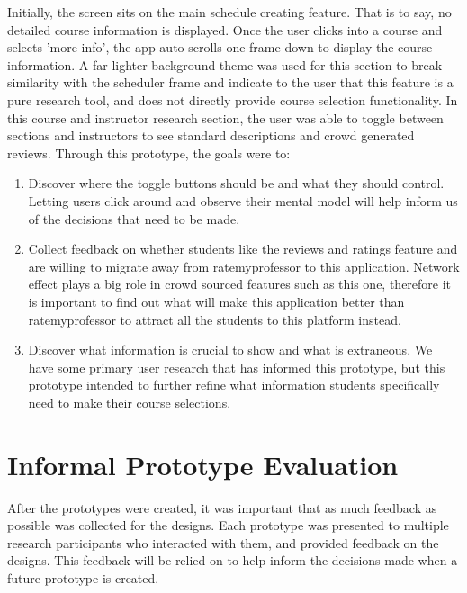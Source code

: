 \documentclass{article}
\begin{document}
\vspace{1em}
\noindent
Initially, the screen sits on the main schedule creating feature. That is to say, no detailed course information is displayed.
Once the user clicks into a course and selects 'more info', the app auto-scrolls one frame down to display the course information. 
A far lighter background theme was used for this section to break similarity with the scheduler frame and indicate to the user that this feature is a pure research tool, and does not directly provide course selection functionality. 
In this course and instructor research section, the user was able to toggle between sections and instructors to see standard descriptions and crowd generated reviews.
\newline
\newline
Through this prototype, the goals were to:
\begin{enumerate}[label=\alph*]
\item Discover where the toggle buttons should be and what they should control. Letting users click around and observe their mental model will help inform us of the decisions that need to be made. 
\item Collect feedback on whether students like the reviews and ratings feature and are willing to migrate away from ratemyprofessor to this application. Network effect plays a big role in crowd sourced features such as this one, therefore it is important to find out what will make this application better than ratemyprofessor to attract all the students to this platform instead.
\item Discover what information is crucial to show and what is extraneous. We have some primary user research that has informed this prototype, but this prototype intended to further refine what information students specifically need to make their course selections. 
\end{enumerate}

\section{Informal Prototype Evaluation}
After the prototypes were created, it was important that as much feedback as possible was collected for the designs. Each prototype was presented to multiple research participants who interacted with them, and provided feedback on the designs. This feedback will be relied on to help inform the decisions made when a future prototype is created.
\end{document}
